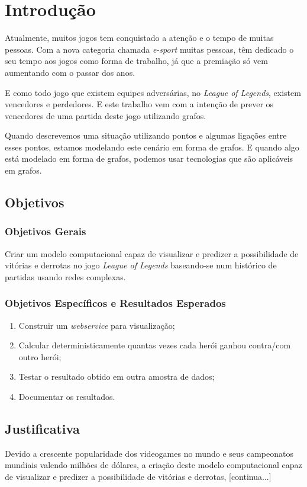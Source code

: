 \chapter{Introdução}
\label{chap:Introducao}

Atualmente, muitos jogos tem conquistado a atenção e o tempo de muitas pessoas. Com a nova categoria chamada \textit{e-sport} muitas pessoas, têm dedicado o seu tempo aos jogos como forma de trabalho, já que a premiação só vem aumentando com o passar dos anos.




E como todo jogo que existem equipes adversárias, no \textit{League of Legends}, existem vencedores e perdedores. E este trabalho vem com a intenção de prever os vencedores de uma partida deste jogo utilizando grafos.

Quando descrevemos uma situação utilizando pontos e algumas ligações entre esses pontos, estamos modelando este cenário em forma de grafos. E quando algo está modelado em forma de grafos, podemos usar tecnologias que são aplicáveis em grafos.

\section{Objetivos}


\subsection{Objetivos Gerais}
Criar um modelo computacional capaz de visualizar e predizer a possibilidade de vitórias e derrotas no jogo \textit{League of Legends} baseando-se num histórico de partidas usando redes complexas.

\subsection{Objetivos Específicos e Resultados Esperados}

\begin{enumerate}
\item Construir um \textit{webservice} para visualização;
\item Calcular deterministicamente quantas vezes cada herói ganhou contra/com outro herói;
\item Testar o resultado obtido em outra amostra de dados;
\item Documentar os resultados.

\end{enumerate}

\section{Justificativa}
Devido a crescente popularidade dos videogames no mundo e seus campeonatos mundiais valendo milhões de dólares, a criação deste modelo computacional capaz de visualizar e predizer a possibilidade de vitórias e derrotas, [continua...]